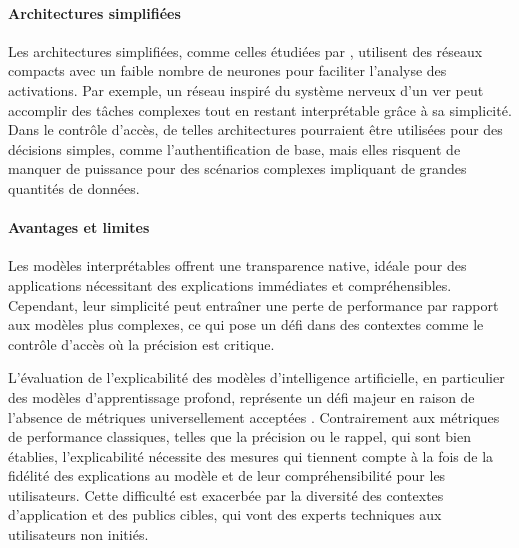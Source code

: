 \paragraph{Architectures simplifiées}  
Les architectures simplifiées, comme celles étudiées par \citet{hasani2019compact}, utilisent des réseaux compacts avec un faible nombre de neurones pour faciliter l’analyse des activations. Par exemple, un réseau inspiré du système nerveux d’un ver peut accomplir des tâches complexes tout en restant interprétable grâce à sa simplicité. Dans le contrôle d’accès, de telles architectures pourraient être utilisées pour des décisions simples, comme l’authentification de base, mais elles risquent de manquer de puissance pour des scénarios complexes impliquant de grandes quantités de données.

\paragraph{Avantages et limites}  
Les modèles interprétables offrent une transparence native, idéale pour des applications nécessitant des explications immédiates et compréhensibles. Cependant, leur simplicité peut entraîner une perte de performance par rapport aux modèles plus complexes, ce qui pose un défi dans des contextes comme le contrôle d’accès où la précision est critique.





L’évaluation de l’explicabilité des modèles d’intelligence artificielle, en particulier des modèles d’apprentissage profond, représente un défi majeur en raison de l’absence de métriques universellement acceptées \cite{jouis2020}. Contrairement aux métriques de performance classiques, telles que la précision ou le rappel, qui sont bien établies, l’explicabilité nécessite des mesures qui tiennent compte à la fois de la fidélité des explications au modèle et de leur compréhensibilité pour les utilisateurs. Cette difficulté est exacerbée par la diversité des contextes d’application et des publics cibles, qui vont des experts techniques aux utilisateurs non initiés.

